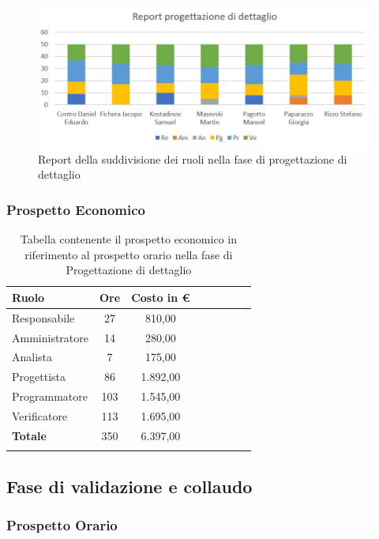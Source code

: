 \documentclass[../piano_di_progetto.tex]{subfiles}
\begin{document}
\begin{figure}[H]
\centering
\includegraphics[width=12cm]{componenti/img/report_prog_dett}
\caption{Report della suddivisione dei ruoli nella fase di progettazione di dettaglio}
\end{figure}

\newpage

\subsubsection{Prospetto Economico}

\begin{center}
	\begin{longtable}{|l|c|c|c|c|c|c|c|}
		\hline
		\rowcolor{lightgray}
		\textbf{Ruolo} & \textbf{Ore} & \textbf{Costo in €}\\
		\hline
		Responsabile & 27 & 810,00\\
		\hline
		Amministratore & 14 & 280,00\\
		\hline
		Analista & 7 & 175,00\\
		\hline
		Progettista & 86 & 1.892,00\\
		\hline
		Programmatore & 103 & 1.545,00\\
		\hline
		Verificatore & 113 & 1.695,00\\
		\hline
		\textbf{Totale} & 350 & 6.397,00\\
		\hline
		\rowcolor{white}
		\caption{Tabella contenente il prospetto economico in riferimento al prospetto orario nella fase di Progettazione di dettaglio}
	\end{longtable}
\end{center}

\subsection{ Fase di validazione e collaudo}%
\label{sub:fase_valid_collaudo}
\subsubsection{Prospetto Orario}
\end{document}
